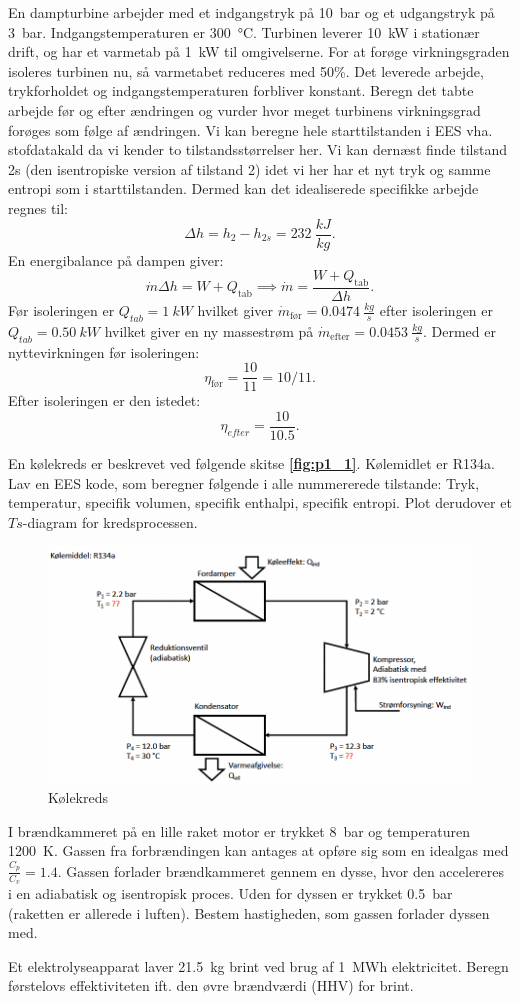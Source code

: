 \documentclass[a4paper]{article}
\begin{document}
En dampturbine arbejder med et indgangstryk på \qty{10}{bar} og et udgangstryk på \qty{3}{bar}. Indgangstemperaturen er \qty{300}{\celsius}. Turbinen leverer \qty{10}{kW} i stationær drift, og har et varmetab på \qty{1}{kW} til omgivelserne. For at forøge virkningsgraden isoleres turbinen nu, så varmetabet reduceres med 50\%. Det leverede arbejde, trykforholdet og indgangstemperaturen forbliver konstant. Beregn det tabte arbejde før og efter ændringen og vurder hvor meget turbinens virkningsgrad forøges som følge af ændringen.
\bigbreak
Vi kan beregne hele starttilstanden i EES vha. stofdatakald da vi kender to tilstandsstørrelser her. Vi kan dernæst finde tilstand 2s (den isentropiske version af tilstand 2) idet vi her har et nyt tryk og samme entropi som i starttilstanden. Dermed kan det idealiserede specifikke arbejde regnes til:
\[ 
\Delta h = h_2 - h_{2s} = \qty{232}{\frac{kJ}{kg}} 
.\]
En energibalance på dampen giver:
\[ 
\dot{m} \Delta h = W + Q_{\mathrm{tab}} \implies \dot{m} = \frac{W + Q_{\mathrm{tab}}}{\Delta h}
.\]
Før isoleringen er $Q_{tab} = \qty{1}{kW} $ hvilket giver $\dot{m}_{\text{før}} = \qty{0,0474}{\frac{kg}{s}} $ efter isoleringen er $Q_{tab} = \qty{0,50}{kW}$ hvilket giver en ny massestrøm på $\dot{m}_{\text{efter}} = \qty{0,0453}{\frac{kg}{s}}$. Dermed er nyttevirkningen før isoleringen:
\[ 
\eta_{\text{før}} = \frac{10}{11} = 10/11
.\]
Efter isoleringen er den istedet:
\[ 
\eta_{efter} = \frac{10}{\num{10,5}}
.\]


En kølekreds er beskrevet ved følgende skitse \textbf{\autoref{fig:p1_1}}. Kølemidlet er R134a. Lav en EES kode, som beregner følgende i alle nummererede tilstande: Tryk, temperatur, specifik volumen, specifik enthalpi, specifik entropi. Plot derudover et $Ts$-diagram for kredsprocessen.

\begin{figure} [ht]
  \centering
  \includegraphics[width=0.5\linewidth]{./figures/p1_1.png}
  \caption{Kølekreds}
  \label{fig:p1_1}
\end{figure}

I brændkammeret på en lille raket motor er trykket \qty{8}{bar}  og temperaturen \qty{1200}{K}. Gassen fra forbrændingen kan antages at opføre sig som en idealgas med $\frac{C_p}{C_v} = \num{1,4} $. Gassen forlader brændkammeret gennem en dysse, hvor den accelereres i en adiabatisk og isentropisk proces. Uden for dyssen er trykket \qty{0,5}{bar} (raketten er allerede i luften). Bestem hastigheden, som gassen forlader dyssen med.

Et elektrolyseapparat laver \qty{21,5}{kg} brint ved brug af \qty{1}{MWh} elektricitet. Beregn førstelovs effektiviteten ift. den øvre brændværdi (HHV) for brint.
\end{document}

